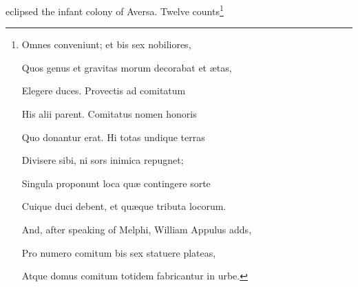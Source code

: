 eclipsed the infant colony of Aversa. Twelve counts\footnote{Omnes conveniunt; et bis sex nobiliores,

Quos genus et gravitas morum decorabat et ætas,

Elegere duces. Provectis ad comitatum

His alii parent. Comitatus nomen honoris

Quo donantur erat. Hi totas undique terras

Divisere sibi, ni sors inimica repugnet;

Singula proponunt loca quæ contingere sorte

Cuique duci debent, et quæque tributa locorum.

And, after speaking of Melphi, William Appulus adds,

Pro numero comitum bis sex statuere plateas,

Atque domus comitum totidem fabricantur in urbe.

}
